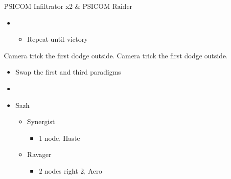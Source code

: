 \begin{paracol}{2}
\begin{battle}{PSICOM Infiltrator x2 \& PSICOM Raider}
\begin{itemize}
			\item \fifth
			      \begin{itemize}
				      \item Repeat until victory
			      \end{itemize}
		\end{itemize}
		 
	\end{battle}
	\renewcommand{\first}{[1] Tide Turner (\syn/\sab)}
	\renewcommand{\second}{[2] War and Peace (\com/\med)}
	\renewcommand{\third}{[3] Slash \& Burn (\com/\rav)}
	\renewcommand{\fourth}{[4] Dualcasting (\rav/\rav)}
	\renewcommand{\fifth}{[5] Undermine (\rav/\sab)}
	\renewcommand{\sixth}{[6] Divide \& Conquer (\com/\sab)}
	\switchcolumn*
	Camera trick the first dodge outside.
	\switchcolumn
	Camera trick the first dodge outside.
	\switchcolumn*
	\begin{menu}
		\begin{itemize}
			\paradigm
			\begin{itemize}
				\item Swap the first and third paradigms
				\item {}%
				      {\paradigmline[1]{\textit{\syn}}{\textit{\sab}}{}}%
				      {\paradigmline{\com}{\med}{}}%
				      {\paradigmline{\com}{\rav}{}}%
				      {\paradigmline{\rav}{\rav}{}}%
				      {\paradigmline{[\rav]}{\sab}{}}%
				      {\paradigmline{[\com]}{\sab}{}}
			\end{itemize}
			\crystarium
			\begin{itemize}
				\item Sazh
				      \begin{itemize}
					      \item Synergist
					            \begin{itemize}
						            \item 1 node, Haste
					            \end{itemize}
					      \item Ravager
					            \begin{itemize}
						            \item 2 nodes right 2, Aero

\end{itemize}
\end{itemize}
\end{itemize}
\end{itemize}
\end{menu}
\end{paracol}

